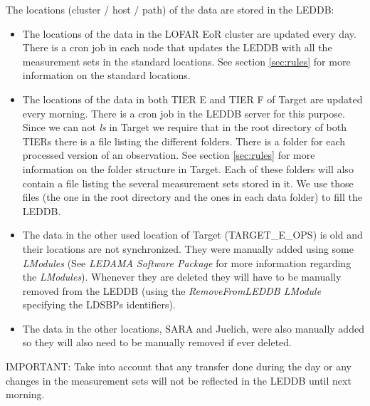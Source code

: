 \documentclass[a4paper,11pt]{article}
\begin{document}
The locations (cluster / host / path) of the data are stored in the LEDDB:
\begin{itemize}
	\item The locations of the data in the LOFAR EoR cluster are updated every day. There is a cron job in each node that updates the LEDDB with all the measurement sets in the standard locations. See section \ref{sec:rules} for more information on the standard locations.
	\item The locations of the data in both TIER E and TIER F of Target are updated every morning. There is a cron job in the LEDDB server for this purpose. Since we can not \textit{ls} in Target we require that in the root directory of both TIERs there is a file listing the different folders. There is a folder for each processed version of an observation. See section \ref{sec:rules} for more information on the folder structure in Target. Each of these folders will also contain a file listing the several measurement sets stored in it. We use those files (the one in the root directory and the ones in each data folder) to fill the LEDDB. 
	\item The data in the other used location of Target (TARGET\_E\_OPS) is old and their locations are not synchronized. They were manually added using some \textit{LModules} (See \textit{LEDAMA Software Package} for more information regarding the \textit{LModules}). Whenever they are deleted they will have to be manually removed from the LEDDB (using the \textit{RemoveFromLEDDB LModule} specifying the LDSBPs identifiers).
	\item The data in the other locations, SARA and Juelich, were also manually added so they will also need to be manually removed if ever deleted.
	
\end{itemize}

IMPORTANT: Take into account that any transfer done during the day or any changes in the measurement sets will not be reflected in the LEDDB until next morning.

\newpage
\end{document}

